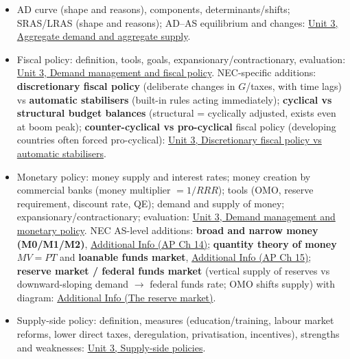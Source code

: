 \documentclass[a4paper,12pt]{article}
\begin{document}
\begin{itemize}
  \item AD curve (shape and reasons), components, determinants/shifts; SRAS/LRAS (shape and reasons); AD--AS equilibrium and changes: \hyperref[sec:ad-as]{Unit 3, Aggregate demand and aggregate supply}.
  \item Fiscal policy: definition, tools, goals, expansionary/contractionary, evaluation: \hyperref[sec:demand-supply-side-policies]{Unit 3, Demand management and fiscal policy}. NEC-specific additions: \textbf{discretionary fiscal policy} (deliberate changes in $G$/taxes, with time lags) vs \textbf{automatic stabilisers} (built-in rules acting immediately); \textbf{cyclical vs structural budget balances} (structural = cyclically adjusted, exists even at boom peak); \textbf{counter-cyclical vs pro-cyclical} fiscal policy (developing countries often forced pro-cyclical): \hyperref[sec:demand-supply-side-policies]{Unit 3, Discretionary fiscal policy vs automatic stabilisers}.
  \item Monetary policy: money supply and interest rates; money creation by commercial banks (money multiplier $=1/RRR$); tools (OMO, reserve requirement, discount rate, QE); demand and supply of money; expansionary/contractionary; evaluation: \hyperref[sec:demand-supply-side-policies]{Unit 3, Demand management and monetary policy}. NEC AS-level additions: \textbf{broad and narrow money (M0/M1/M2)}, \hyperref[sec:add-money]{Additional Info (AP Ch 14)}; \textbf{quantity theory of money $MV = PT$} and \textbf{loanable funds market}, \hyperref[sec:add-loanable]{Additional Info (AP Ch 15)}; \textbf{reserve market / federal funds market} (vertical supply of reserves vs downward-sloping demand $\to$ federal funds rate; OMO shifts supply) with diagram: \hyperref[sec:add-reserve-market]{Additional Info (The reserve market)}.
  \item Supply-side policy: definition, measures (education/training, labour market reforms, lower direct taxes, deregulation, privatisation, incentives), strengths and weaknesses: \hyperref[sec:demand-supply-side-policies]{Unit 3, Supply-side policies}.
\end{itemize}
\end{document}
